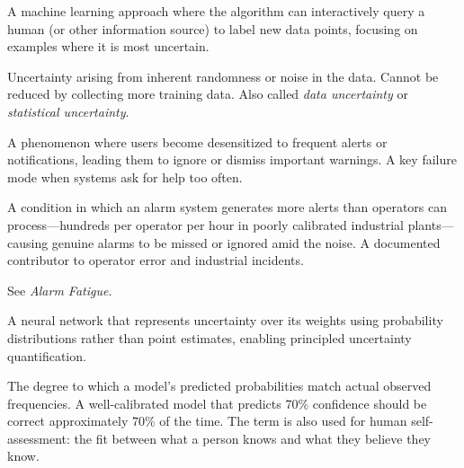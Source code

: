 
\begin{description}[style=nextline, leftmargin=2em]

\item[Active Learning]
A machine learning approach where the algorithm can interactively query a human (or other information source) to label new data points, focusing on examples where it is most uncertain.

\item[Aleatoric Uncertainty]
Uncertainty arising from inherent randomness or noise in the data. Cannot be reduced by collecting more training data. Also called \emph{data uncertainty} or \emph{statistical uncertainty}.

\item[Alarm Fatigue (Alert Fatigue)]
A phenomenon where users become desensitized to frequent alerts or notifications, leading them to ignore or dismiss important warnings. A key failure mode when systems ask for help too often.

\item[Alarm Flood]
A condition in which an alarm system generates more alerts than operators can process---hundreds per operator per hour in poorly calibrated industrial plants---causing genuine alarms to be missed or ignored amid the noise. A documented contributor to operator error and industrial incidents.

\item[Alert Fatigue]
See \emph{Alarm Fatigue}.

\item[Bayesian Neural Network (BNN)]
A neural network that represents uncertainty over its weights using probability distributions rather than point estimates, enabling principled uncertainty quantification.

\item[Calibration]
The degree to which a model's predicted probabilities match actual observed frequencies. A well-calibrated model that predicts 70\% confidence should be correct approximately 70\% of the time. The term is also used for human self-assessment: the fit between what a person knows and what they believe they know.


\end{description}
